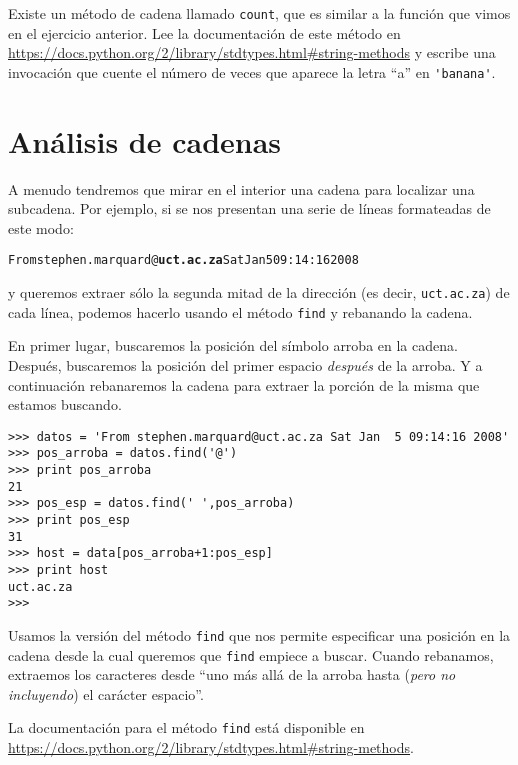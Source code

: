 \begin{ex}

Existe un método de cadena llamado {\tt count}, que es similar a la función
que vimos en el ejercicio anterior. Lee la documentación
de este método en
\url{https://docs.python.org/2/library/stdtypes.html#string-methods}
y escribe una invocación que cuente el número de veces que
aparece la letra ``a''
en \verb"'banana'".
\end{ex}

\section{Análisis de cadenas}

A menudo tendremos que mirar en el interior una cadena para localizar una subcadena. Por
ejemplo, si se nos presentan una serie de líneas formateadas de este modo:

\beforeverb
\begin{alltt}
From stephen.marquard@{\bf uct.ac.za} Sat Jan  5 09:14:16 2008
\end{alltt}
\afterverb

y queremos extraer sólo la segunda mitad de la dirección (es decir,
{\tt uct.ac.za}) de cada línea, podemos hacerlo usando el método
{\tt find} y rebanando la cadena.

En primer lugar, buscaremos la posición del símbolo arroba en la cadena. Después,
buscaremos la posición del primer espacio \emph{después} de la arroba. Y a continuación
rebanaremos la cadena para extraer la porción de la misma que estamos
buscando.

\beforeverb
\begin{verbatim}
>>> datos = 'From stephen.marquard@uct.ac.za Sat Jan  5 09:14:16 2008'
>>> pos_arroba = datos.find('@')
>>> print pos_arroba
21
>>> pos_esp = datos.find(' ',pos_arroba)
>>> print pos_esp
31
>>> host = data[pos_arroba+1:pos_esp]
>>> print host
uct.ac.za
>>> 
\end{verbatim}
\afterverb
%
Usamos la versión del método {\tt find} que nos permite especificar
una posición en la cadena desde la cual queremos que {\tt find} empiece a buscar.
Cuando rebanamos, extraemos los caracteres
desde ``uno más allá de la arroba hasta (\emph{pero no incluyendo}) el
carácter espacio''.

La documentación para el método {\tt find} está disponible en 
\url{https://docs.python.org/2/library/stdtypes.html#string-methods}.

